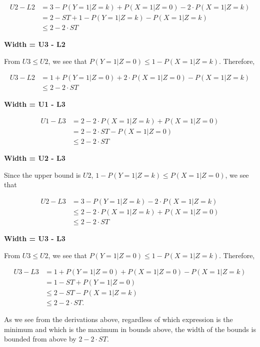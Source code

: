 \documentclass[
]{article}
\theoremstyle{plain}
\begin{document}
\[\begin{aligned}
U2 - L2 &= 3 - P(Y = 1 | Z = k) + P(X = 1 | Z = 0) - 2\cdot P(X = 1 | Z = k) \\
        &= 2 - ST + 1 - P(Y = 1 | Z = k) - P(X = 1 | Z = k) \\
        &\le 2 - 2\cdot ST
\end{aligned}\]

\textbf{Width = U3 - L2}

From \(U3 \le U2\), we see that \(P(Y = 1 | Z = 0) \le 1 - P(X = 1 | Z = k)\). Therefore,

\[\begin{aligned}
U3 - L2 &= 1 + P(Y = 1 | Z = 0) + 2\cdot P(X = 1 | Z = 0) - P(X = 1 | Z = k) \\
        &\le 2 - 2\cdot ST
\end{aligned}\]

\textbf{Width = U1 - L3}

\[\begin{aligned}
U1 - L3 &= 2 - 2\cdot P(X = 1 | Z = k) + P(X = 1 | Z = 0) \\
        &= 2 - 2\cdot ST - P(X = 1 | Z = 0) \\
        &\le 2 - 2\cdot ST
\end{aligned}\]

\textbf{Width = U2 - L3}

Since the upper bound is \(U2\), \(1 - P(Y = 1 | Z = k) \le P(X = 1 | Z = 0)\), we see that

\[\begin{aligned}
U2 - L3 &= 3 - P(Y = 1 | Z = k) - 2\cdot P(X = 1 | Z = k) \\
        &\le 2 - 2\cdot P(X = 1 | Z = k) + P(X = 1 | Z = 0) \\
        &\le 2 - 2\cdot ST
\end{aligned}\]

\textbf{Width = U3 - L3}

From \(U3 \le U2\), we see that \(P(Y = 1 | Z = 0) \le 1 - P(X = 1 | Z = k)\). Therefore,

\[\begin{aligned}
U3 - L3 &= 1 + P(Y = 1 | Z = 0) + P(X = 1 | Z = 0) - P(X = 1 | Z = k)\\
        &= 1 - ST + P(Y = 1 | Z = 0) \\
        &\le 2 - ST - P(X = 1 | Z = k) \\
        &\le 2 - 2\cdot ST.
\end{aligned}\]

As we see from the derivations above, regardless of which expression is the minimum and which is the maximum in bounds above, the width of the bounds is bounded from above by \(2 - 2\cdot ST\).
\end{document}
